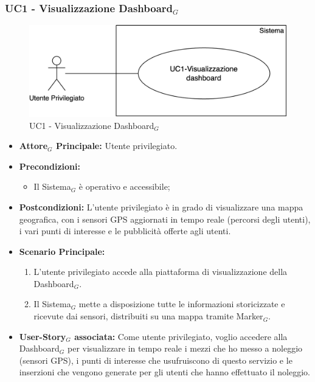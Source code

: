 \documentclass[10pt]{article}
\begin{document}
\begin{justify}
\subsubsection{\textbf{UC1 - Visualizzazione Dashboard$_G$}}
\begin{figure}[H]
    \centering
    \includegraphics[width=0.7\linewidth]{UC1image.png}
    \caption{UC1 - Visualizzazione Dashboard$_G$}
    \label{fig:UC1}
\end{figure}
\begin{itemize}
    \item \textbf{Attore$_G$ Principale:} Utente privilegiato.
    \item \textbf{Precondizioni:} 
        \begin{itemize}
          \item Il Sistema$_G$ è operativo e accessibile;
        \end{itemize}
    \item \textbf{Postcondizioni:} L'utente privilegiato è in grado di visualizzare una mappa geografica, con i sensori GPS aggiornati in tempo reale (percorsi degli utenti), i vari punti di interesse e le pubblicità offerte agli utenti.
    \item \textbf{Scenario Principale:}
        \begin{enumerate}
            \item L'utente privilegiato accede alla piattaforma di visualizzazione della Dashboard$_G$.
            \item Il Sistema$_G$ mette a disposizione tutte le informazioni storicizzate e ricevute dai sensori, distribuiti su una mappa tramite Marker$_G$.
        \end{enumerate}
    \item \textbf{User-Story$_G$ associata:} Come utente privilegiato, voglio accedere alla Dashboard$_G$ per visualizzare in tempo reale i mezzi che ho messo a noleggio (sensori GPS), i punti di interesse che usufruiscono di questo servizio e le inserzioni che vengono generate per gli utenti che hanno effettuato il noleggio.
\end{itemize}



\end{justify}
\end{document}
